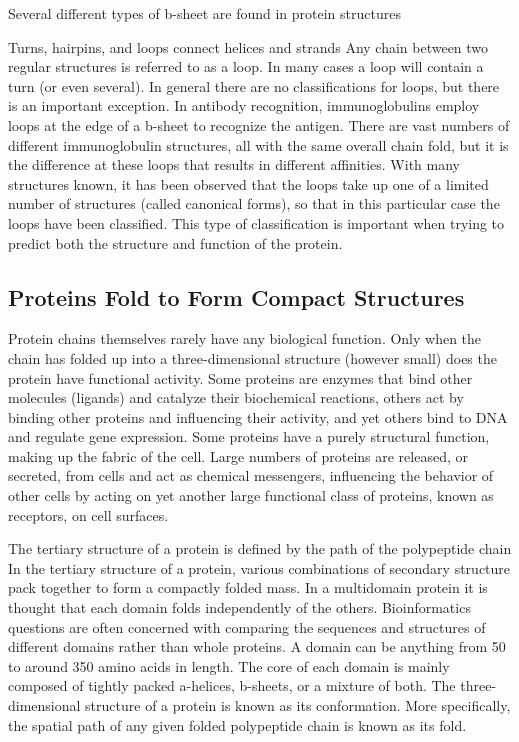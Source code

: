 \documentclass{article}
\begin{document}
Several different types of b-sheet are found in protein structures


Turns, hairpins, and loops connect helices and strands
Any chain between two regular structures is referred to as a loop. In many cases a loop will contain a turn (or even several). In general there are no classifications for loops, but there is an important exception. In antibody recognition, immunoglobulins employ loops at the edge of a b-sheet to recognize the antigen. There are vast numbers of different immunoglobulin structures, all with the same overall chain fold, but it is the difference at these loops that results in different affinities. With many structures known, it has been observed that the loops take up one of a limited number of structures (called canonical forms), so that in this particular case the loops have been classified. This type of classification is important when trying to predict both the structure and function of the protein.


\subsection{Proteins Fold to Form Compact Structures}

Protein chains themselves rarely have any biological function. Only when the chain has folded up into a three-dimensional structure (however small) does the protein have functional activity. Some proteins are enzymes that bind other molecules (ligands) and catalyze their biochemical reactions, others act by binding other proteins and influencing their activity, and yet others bind to DNA and regulate gene expression. Some proteins have a purely structural function, making up the fabric of the cell. Large numbers of proteins are released, or secreted, from cells and act as chemical messengers, influencing the behavior of other cells by acting on yet another large functional class of proteins, known as receptors, on cell surfaces.

The tertiary structure of a protein is defined by the path of the polypeptide chain
In the tertiary structure of a protein, various combinations of secondary structure pack together to form a compactly folded mass. In a multidomain protein it is thought that each domain folds independently of the others. Bioinformatics questions are often concerned with comparing the sequences and structures of different domains rather than whole proteins. A domain can be anything from 50 to around 350 amino acids in length. The core of each domain is mainly composed of tightly packed a-helices, b-sheets, or a mixture of both. The three- dimensional structure of a protein is known as its conformation. More specifically, the spatial path of any given folded polypeptide chain is known as its fold.
\end{document}
